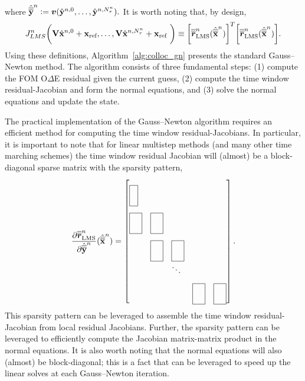 where $\hat{\overline{\overline{\mathbf{y}}}}^{n} \vcentcolon= \boldsymbol v (\hat{\mathbf{y}}^{n,0},\ldots,\hat{\mathbf{y}}^{n,N_{\tau}^{n}} ).$
It is worth noting that, by design,
\begin{equation*}
J_{LMS}^{n} \bigg( \mathbf {V} \hat{\mathbf{x}}^{n,0} + \mathbf{x}_\text{ref},\ldots,\mathbf {V} \hat{\mathbf{x}}^{n,N_{\tau}^{n}} + \mathbf{x}_\text{ref} \ \bigg) 
\equiv
\bigg[\overline{\overline{\boldsymbol r}}^{n}_{\text{LMS}}  (\hat{\overline{\overline{\mathbf {x}}}}^{n}) \bigg]^T \bigg[ \overline{\overline{\boldsymbol r}}^{n}_{\text{LMS}}(\hat{\overline{\overline{\mathbf {x}}}}^{n}) \bigg].
\end{equation*} 
Using these definitions, Algorithm~\ref{alg:colloc_gn} presents the standard Gauss--Newton method. The algorithm consists of three fundamental steps: (1) compute the FOM O$\Delta$E residual given the current guess, (2) compute the time window residual-Jacobian and form the normal equations, and (3) solve the normal equations and update the state. 

The practical implementation of the Gauss--Newton algorithm requires an efficient method for computing the time window residual-Jacobians. In particular, it is important to note that for linear multistep methods (and many other time marching schemes) the time window residual Jacobian will (almost) be a block-diagonal 
sparse matrix with the sparsity pattern,
\begin{equation*}
\frac{\partial \residLMSSlabArg{n}}{\partial \genstatecollocMatySlabArg{n}}(\genstatecollocMatSlabArg{n})  =
 \begin{bmatrix*}[l]
\matshapeb & \\%
 \matshapea & \matshapea & \\%
 & \matshapea  & \matshapea & \\%
&  & \ddots & \\%
 & &  & \matshapea &  \matshapea 
\end{bmatrix*}.
\end{equation*}
This sparsity pattern can be leveraged to assemble the time window residual-Jacobian from local residual Jacobians. 
Further, the sparsity pattern can be 
leveraged to efficiently compute the Jacobian matrix-matrix product in the normal equations.
It is also worth noting that the 
normal equations will also (almost) be block-diagonal; this is a fact that can be leveraged to speed up the linear solves at each Gauss--Newton iteration.


